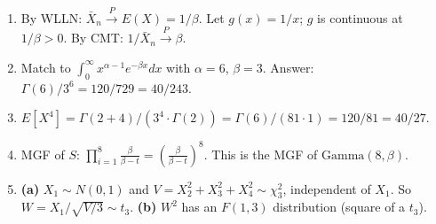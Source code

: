 \documentclass[11pt]{article}
\begin{document}
\begin{enumerate}
\item By WLLN: $\bar X_n \xrightarrow{P} E(X) = 1/\beta$. Let $g(x) = 1/x$; $g$ is continuous at $1/\beta > 0$. By CMT: $\boxed{1/\bar X_n \xrightarrow{P} \beta}$.

\item Match to $\int_0^\infty x^{\alpha-1}e^{-\beta x}dx$ with $\alpha = 6$, $\beta = 3$. Answer: $\Gamma(6)/3^6 = 120/729 = \boxed{40/243}$.

\item $E[X^4] = \Gamma(2+4)/\!\left(3^4 \cdot \Gamma(2)\right) = \Gamma(6)/\!\left(81 \cdot 1\right) = 120/81 = \boxed{40/27}$.

\item MGF of $S$: $\prod_{i=1}^8 \frac{\beta}{\beta - t} = \left(\frac{\beta}{\beta - t}\right)^8$. This is the MGF of $\boxed{\text{Gamma}(8, \beta)}$.

\item \textbf{(a)} $X_1 \sim N(0,1)$ and $V = X_2^2 + X_3^2 + X_4^2 \sim \chi^2_3$, independent of $X_1$. So $W = X_1/\sqrt{V/3} \sim \boxed{t_3}$. \textbf{(b)} $W^2$ has an $F(1,3)$ distribution (square of a $t_3$).
\end{enumerate}
\end{document}
